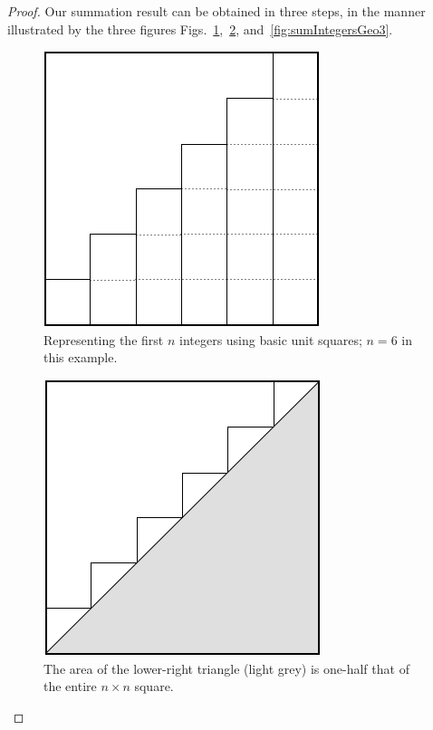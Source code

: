 \begin{proof}
Our summation result can be obtained in three steps, in the manner
illustrated by the three figures
Figs.~\ref{fig:sumIntegersGeo1},~\ref{fig:sumIntegersGeo2},
and~\ref{fig:sumIntegersGeo3}.
\begin{figure}[h]
\begin{center}
       \includegraphics[scale=0.4]{FiguresMaths/SumIntegersGeometricBasis}
\caption{Representing the first $n$ integers using basic unit squares; $n=6$ in this example.}
       \label{fig:sumIntegersGeo1}
\end{center}
\end{figure}
\begin{figure}[h]
\begin{center}
       \includegraphics[scale=0.4]{FiguresMaths/SumIntegersGeometricIntermediate}
\caption{The area of the lower-right triangle (light grey) is one-half that of
  the entire $n \times n$ square.}
       \label{fig:sumIntegersGeo2}
\end{center}
\end{figure}

\end{proof}

